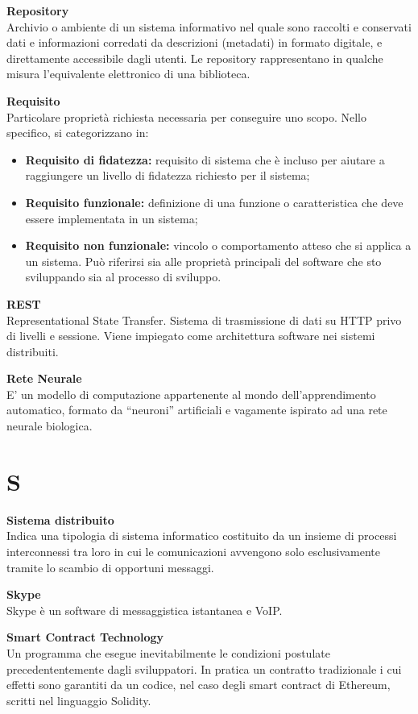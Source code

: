 \documentclass[a4paper, oneside, openany, dvipsnames, table, 12pt]{article}
\begin{document}
\textbf{Repository} \\
Archivio o ambiente di un sistema informativo nel quale sono raccolti e conservati dati e informazioni corredati da descrizioni (metadati) in formato digitale, e direttamente accessibile dagli utenti. Le repository
rappresentano in qualche misura l’equivalente elettronico di una biblioteca.

\textbf{Requisito}\\	Particolare proprietà richiesta necessaria per conseguire uno scopo. Nello specifico, si categorizzano in:
\begin{itemize}
	\item \textbf{Requisito di fidatezza:} requisito di sistema che è incluso per aiutare a raggiungere un livello di fidatezza richiesto per il sistema;
	\item \textbf{Requisito funzionale:} definizione di una funzione o caratteristica che deve essere implementata in un sistema;
	\item \textbf{Requisito non funzionale:} vincolo o comportamento atteso che si applica a un sistema. Può riferirsi sia alle proprietà principali del software che sto sviluppando sia al processo di sviluppo.
\end{itemize}

\textbf{REST} \\
Representational State Transfer. Sistema di trasmissione di dati su HTTP privo di livelli e sessione. Viene impiegato come architettura software nei sistemi distribuiti.

\textbf{Rete Neurale} \\
E’ un modello di computazione appartenente al mondo dell’apprendimento automatico, formato da “neuroni” artificiali e vagamente ispirato ad una rete neurale biologica.


\newpage
\section{S}
\textbf{Sistema distribuito} \\
Indica una tipologia di sistema informatico costituito da un insieme di processi interconnessi tra loro in cui le comunicazioni avvengono solo esclusivamente tramite lo scambio di opportuni messaggi.

\textbf{Skype} \\
Skype è un software di messaggistica istantanea e VoIP\glo.

\textbf{Smart Contract Technology} \\
Un programma che esegue inevitabilmente le condizioni postulate precedententemente dagli sviluppatori. In pratica un contratto tradizionale i cui effetti sono garantiti da un codice, nel caso degli smart contract di Ethereum, scritti nel linguaggio Solidity.
\end{document}
